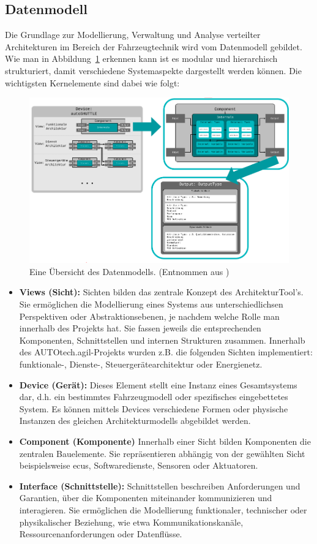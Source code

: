 \subsection*{Datenmodell}

Die Grundlage zur Modellierung, Verwaltung und Analyse verteilter Architekturen im Bereich der Fahrzeugtechnik wird vom Datenmodell gebildet. Wie man in Abbildung~\ref{fig:overview_daten} erkennen kann  ist es modular und hierarchisch strukturiert, damit verschiedene Systemaspekte dargestellt werden können. Die wichtigsten Kernelemente sind dabei wie folgt:

\begin{figure}[h!]
  \centering
  \includegraphics[width=.9\textwidth]{figures/02Grundlagen/Overview_datenmodell.png}
  \caption{Eine Übersicht des Datenmodells. (Entnommen aus \cite{architekturtooldocu2024})}
  \label{fig:overview_daten}
\end{figure}

\begin{itemize}
  \item \textbf{Views (Sicht):} Sichten bilden das zentrale Konzept des ArchitekturTool's. Sie ermöglichen die Modellierung eines Systems aus unterschiedlichsen Perspektiven oder Abstraktionsebenen, je nachdem welche Rolle man innerhalb des Projekts hat. Sie fassen jeweils die entsprechenden Komponenten, Schnittstellen und internen Strukturen zusammen. Innerhalb des AUTOtech.agil-Projekts wurden z.B. die folgenden Sichten implementiert: funktionale-, Dienste-, Steuergerätearchitektur oder Energienetz.
  \item \textbf{Device (Gerät):} Dieses Element stellt eine Instanz eines Gesamtsystems dar, d.h. ein bestimmtes Fahrzeugmodell oder spezifisches eingebettetes System. Es können mittels Devices verschiedene Formen oder physische Instanzen des gleichen Architekturmodells abgebildet werden.
  \item \textbf{Component (Komponente)} Innerhalb einer Sicht bilden Komponenten die zentralen Bauelemente. Sie repräsentieren abhängig von der gewählten Sicht beispielsweise \glspl{ecu}, Softwaredienste, Sensoren oder Aktuatoren.
  \item \textbf{Interface (Schnittstelle):} Schnittstellen beschreiben Anforderungen und Garantien, über die Komponenten miteinander kommunizieren und interagieren. Sie ermöglichen die Modellierung funktionaler, technischer oder physikalischer Beziehung, wie etwa Kommunikationskanäle, Ressourcenanforderungen oder Datenflüsse.
\end{itemize}

